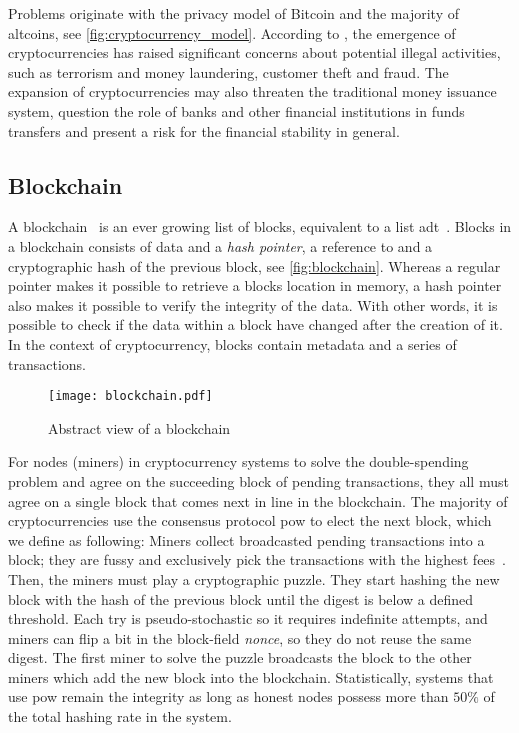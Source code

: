 Problems originate with the privacy model of Bitcoin and the majority of altcoins, see \autoref{fig:cryptocurrency_model}. According to \cite{bitcoin_regulation}, the emergence of cryptocurrencies has raised significant concerns about potential illegal activities, such as terrorism and money laundering, customer theft and fraud. The expansion of cryptocurrencies may also threaten the traditional money issuance system, question the role of banks and other financial institutions in funds transfers and present a risk for the financial stability in general.

\subsection{Blockchain}\label{sec:blockchain}
A blockchain~\cite{bitcoin_book} is an ever growing list of blocks, equivalent to a list \ac{adt}~\cite{bitcoin_book}. Blocks in a blockchain consists of data and a \emph{hash pointer}, a reference to and a cryptographic hash of the previous block, see \autoref{fig:blockchain}. Whereas a regular pointer makes it possible to retrieve a blocks location in memory, a hash pointer also makes it possible to verify the integrity of the data. With other words, it is possible to check if the data within a block have changed after the creation of it. In the context of cryptocurrency, blocks contain metadata and a series of transactions.

\begin{figure}[ht]
    \texttt{[image: blockchain.pdf]}
    \caption{Abstract view of a blockchain}
    \label{fig:blockchain}
\end{figure}

For nodes (miners) in cryptocurrency systems to solve the double-spending problem and agree on the succeeding block of pending transactions, they all must agree on a single block that comes next in line in the blockchain. The majority of cryptocurrencies use the consensus protocol \ac{pow} to elect the next block, which we define as following: Miners collect broadcasted pending transactions into a block; they are fussy and exclusively pick the transactions with the highest fees~\cite{trends_fee, trans_fee}. Then, the miners must play a cryptographic puzzle. They start hashing the new block with the hash of the previous block until the digest is below a defined threshold. Each try is pseudo-stochastic so it requires indefinite attempts, and miners can flip a bit in the block-field \emph{nonce}, so they do not reuse the same digest. The first miner to solve the puzzle broadcasts the block to the other miners which add the new block into the blockchain. Statistically, systems that use \ac{pow} remain the integrity as long as honest nodes possess more than $50\%$ of the total hashing rate in the system.


